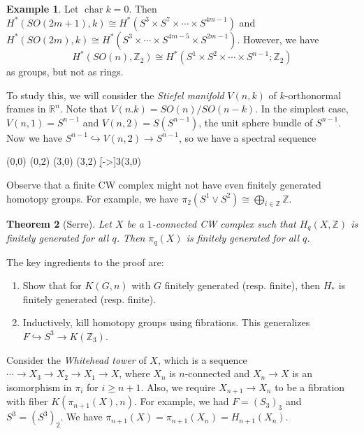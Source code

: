 \documentclass[leqno, openany]{memoir}
\newtheorem{thm}{Theorem}[section]
\theoremstyle{definition}
\newtheorem{exm}[thm]{Example}
\theoremstyle{remark}
\theoremstyle{plain}
\theoremstyle{definition}
\theoremstyle{remark}
\newcommand{\R}{\mathbb{R}}
\newcommand{\Z}{\mathbb{Z}}
\begin{document}
\begin{exm}
    Let $\operatorname{char} k = 0$. Then $H^*(SO(2m+1), k) \cong H^*(S^3 \times S^7 \times \cdots \times S^{4m-1})$ and $H^*(SO(2m), k) \cong H^*(S^3 \times \cdots \times S^{4m-5} \times S^{2m-1})$. However, we have
    \[ H^*(SO(n), \Z_2) \cong H^*(S^1 \times S^2 \times \cdots \times S^{n-1}; \Z_2) \]
    as groups, but not as rings.

    To study this, we will consider the \textit{Stiefel manifold} $V(n,k)$ of $k$-orthonormal frames in $\R^n$. Note that $V(n.k) = SO(n) / SO(n-k)$. In the simplest case, $V(n,1) = S^{n-1}$ and $V(n,2) = S(S^{n-1})$, the unit sphere bundle of $S^{n-1}$. Now we have $S^{n-1} \hookrightarrow V(n,2) \to S^{n-1}$, so we have a spectral sequence
    \begin{center}
    \begin{sseqdata}[name=stiefel, homological Serre grading, classes={draw=none}]
        \class["\Z"](0,0)
        \class["\Z"](0,2)
        \class["\Z"](3,0)
        \class["\Z"](3,2)
        \d[->]3(3,0)
    \end{sseqdata}
    \printpage[name=stiefel,page=3, grid=chess]
    \end{center}
\end{exm}

Observe that a finite CW complex might not have even finitely generated homotopy groups. For example, we have $\pi_2(S^1 \vee S^2) \cong \bigoplus_{i \in \Z} \Z$.

\begin{thm}[Serre]
    Let $X$ be a $1$-connected CW complex such that $H_q(X, \Z)$ is finitely generated for all $q$. Then $\pi_q(X)$ is finitely generated for all $q$.
\end{thm}

The key ingredients to the proof are:
\begin{enumerate}
    \item Show that for $K(G, n)$ with $G$ finitely generated (resp. finite), then $H_*$ is finitely generated (resp. finite).
    \item Inductively, kill homotopy groups using fibrations. This generalizes $F \hookrightarrow S^3 \to K(\Z_3)$.
\end{enumerate}

Consider the \textit{Whitehead tower} of $X$, which is a sequence $\cdots \to X_3 \to X_2 \to X_1 \to X$, where $X_n$ is $n$-connected and $X_n \to X$ is an isomorphism in $\pi_i$ for $i \geq n+1$. Also, we require $X_{n+1} \to X_n$ to be a fibration with fiber $K(\pi_{n+1}(X), n)$. For example, we had $F = {(S_3)}_3$ and $S^3 = {(S^3)}_2$. We have $\pi_{n+1}(X) = \pi_{n+1}(X_n) = H_{n+1}(X_n)$.
\end{document}

